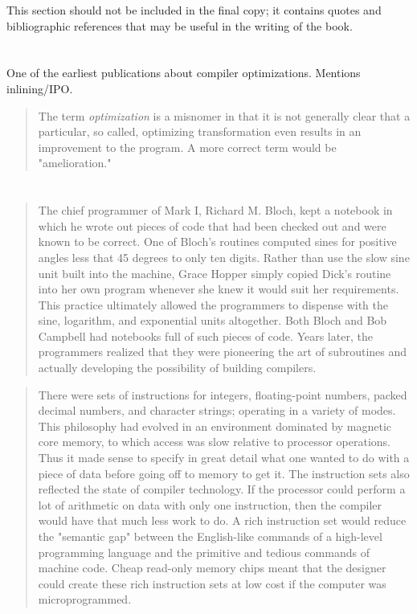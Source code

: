 
This section should not be included in the final copy;
it contains quotes and bibliographic references that may be useful in the writing of the book.

\vspace{1em}

\section{\textcite{allen_catalogue_1971}}

One of the earliest publications about compiler optimizations. Mentions inlining/IPO.

\begin{quotation}
The term \textit{optimization} is a misnomer in that it is not generally clear that a particular, so called, optimizing transformation even results in an improvement to the program. A more correct term would be "amelioration."
\end{quotation}

\section{\textcite{the_first_computers_2002}}

\begin{quotation}
The chief programmer of Mark I, Richard M. Bloch, kept a notebook in which he wrote out pieces of code
that had been checked out and were known to be correct. One of Bloch's routines computed sines for
positive angles less that 45 degrees to only ten digits. Rather than use the slow sine unit built into the
machine, Grace Hopper simply copied Dick's routine into her own program whenever she knew it would suit
her requirements. This practice ultimately allowed the programmers to dispense with the sine, logarithm, and
exponential units altogether. Both Bloch and Bob Campbell had notebooks full of such pieces of code. Years
later, the programmers realized that they were pioneering the art of subroutines and actually developing the
possibility of building compilers.
\end{quotation}

\begin{quotation}
There were sets of instructions for integers, floating-point numbers, packed decimal numbers, and character
strings; operating in a variety of modes. This philosophy had evolved in an environment dominated by
magnetic core memory, to which access was slow relative to processor operations. Thus it made sense to
specify in great detail what one wanted to do with a piece of data before going off to memory to get it. The
instruction sets also reflected the state of compiler technology. If the processor could perform a lot of
arithmetic on data with only one instruction, then the compiler would have that much less work to do. A rich
instruction set would reduce the "semantic gap" between the English-like commands of a high-level
programming language and the primitive and tedious commands of machine code. Cheap read-only memory
chips meant that the designer could create these rich instruction sets at low cost if the computer was microprogrammed.
\end{quotation}

